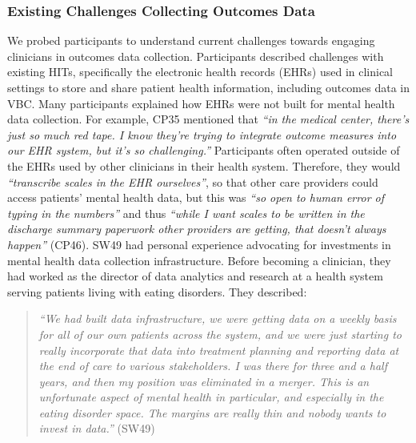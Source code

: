 \subsubsection{Existing Challenges Collecting Outcomes Data}
\label{sec:findings:collection:challenges}

We probed participants to understand current challenges towards engaging clinicians in outcomes data collection.
Participants described challenges with existing HITs, specifically the electronic health records (EHRs) used in clinical settings to store and share patient health information, including outcomes data in VBC.
Many participants explained how EHRs were not built for mental health data collection.
For example, CP35 mentioned that \textit{``in the medical center, there's just so much red tape. I know they're trying to integrate outcome measures into our EHR system, but it's so challenging.''}
Participants often operated outside of the EHRs used by other clinicians in their health system.
Therefore, they would \textit{``transcribe scales in the EHR ourselves''}, so that other care providers could access patients' mental health data, but this was \textit{``so open to human error of typing in the numbers''} and thus \textit{``while I want scales to be written in the discharge summary paperwork other providers are getting, that doesn't always happen''} (CP46).
SW49 had personal experience advocating for investments in mental health data collection infrastructure.
Before becoming a clinician, they had worked as the director of data analytics and research at a health system serving patients living with eating disorders. 
They described: 

\begin{quote}
    \textit{``We had built data infrastructure, we were getting data on a weekly basis for all of our own patients across the system, and we were just starting to really incorporate that data into treatment planning and reporting data at the end of care to various stakeholders.
    I was there for three and a half years, and then my position was eliminated in a merger.
    This is an unfortunate aspect of mental health in particular, and especially in the eating disorder space. 
    The margins are really thin and nobody wants to invest in data.''} (SW49)
\end{quote}

